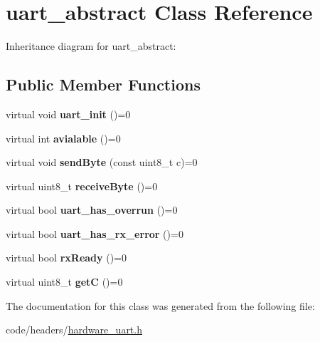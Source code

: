 \hypertarget{classuart__abstract}{}\section{uart\+\_\+abstract Class Reference}
\label{classuart__abstract}


Inheritance diagram for uart\+\_\+abstract\+:
\subsection*{Public Member Functions}
\begin{DoxyCompactItemize}
\item 
\mbox{\label{classuart__abstract_a44203f54f9cdbe8c3ea71ad65d3be62b}} 
virtual void {\bfseries uart\+\_\+init} ()=0
\item 
\mbox{\label{classuart__abstract_a38f7efba4039c82f8c70a1891bb9a577}} 
virtual int {\bfseries avialable} ()=0
\item 
\mbox{\label{classuart__abstract_a8956fc6951a4b5860f0ef44b424929bb}} 
virtual void {\bfseries send\+Byte} (const uint8\+\_\+t c)=0
\item 
\mbox{\label{classuart__abstract_ad26f90ebb38ac73e23693cc5aafc3954}} 
virtual uint8\+\_\+t {\bfseries receive\+Byte} ()=0
\item 
\mbox{\label{classuart__abstract_a8a10405e3e52c8175899a443871c1598}} 
virtual bool {\bfseries uart\+\_\+has\+\_\+overrun} ()=0
\item 
\mbox{\label{classuart__abstract_a5bef51a86d044af4537c975460d4aac2}} 
virtual bool {\bfseries uart\+\_\+has\+\_\+rx\+\_\+error} ()=0
\item 
\mbox{\label{classuart__abstract_a3d93d3e15a85df80fcef701552f91080}} 
virtual bool {\bfseries rx\+Ready} ()=0
\item 
\mbox{\label{classuart__abstract_a701d4eec1363bec9a7677e3b1f6c68b3}} 
virtual uint8\+\_\+t {\bfseries getC} ()=0
\end{DoxyCompactItemize}


The documentation for this class was generated from the following file\+:\begin{DoxyCompactItemize}
\item 
code/headers/\hyperlink{hardware__uart_8h}{hardware\+\_\+uart.\+h}\end{DoxyCompactItemize}
